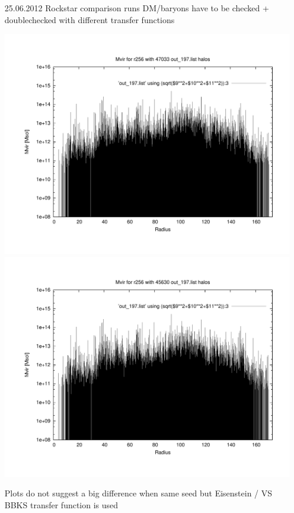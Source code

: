 \begin{itemize}
\begin{table}
\begin{tabular}{l|c|c}
 \end{tabular}
\end{table}

\item[25.06.2012]
Rockstar comparison runs DM/baryons have to be checked + doublechecked with 
different transfer functions 

\includegraphics[scale=0.25]{r256/h70/mu_100h70_8-514200/plot_mvir_out_197.pdf}
\includegraphics[scale=0.25]{r256/h70/mu_100h70_8-514200_bbks/plot_mvir_out_197.pdf}

Plots do not suggest a big difference when same seed but Eisenstein / VS BBKS transfer 
function is used


\end{itemize}
